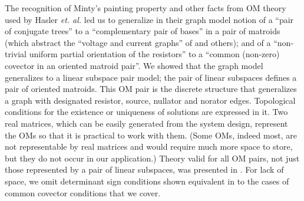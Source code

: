 \documentclass{article}
\newcommand{\extra}[1]{}
\begin{document}
\extra{Preliminary connections between our approach and the 
issue of DC operating point stability \cite{Green} were published
\cite{sdcISCAS98}, but relating these determinant based results
to common covectors is still under investigation.}

The recognition of Minty's painting property\cite{VandewalleChua} 
and other facts
from OM
theory used by Hasler \textit{et. al.} 
\cite{HaslerNeirynck,Fosseprez,HaslerDApplMath} led us to 
generalize in \cite{sdcOMP}
their graph model notion of a ``pair of 
conjugate trees''
to a ``complementary pair of bases''
in a pair of matroids (which abstract the ``voltage and current graphs''
of \cite{ChensBook} and others); and of 
a ``non-trivial uniform partial orientation of the resistors''
to a ``common (non-zero) covector in an oriented matroid pair''.   
We showed that the graph model 
generalizes to a linear subspace pair model;
the pair of linear subspaces defines a pair of oriented matroids.
This OM pair is the discrete structure that
generalizes a graph with designated resistor, source, nullator
and norator edges.
Topological conditions
for the existence or uniqueness of solutions
are expressed in it. 
Two real matrices, which can be easily generated
from the system design, represent the OMs so that 
it is practical to work with them.  (Some OMs, indeed 
most, are not representable by real matrices and would require much more
space to store, but they do not occur in our application.)
Theory valid for all OM pairs, not just those represented by
a pair of linear subspaces, was presented in \cite{sdcOMP}.  For lack of
space, we omit determinant sign conditions shown equivalent
in \cite{sdcOMP} to the cases of common covector conditions that we cover.


\extra{

In the electrical circuit theory literature, the circuit ``topology''
means the network graph (to which Kirchhoff's laws apply)
together with particular kinds of ``device elements''
such as resistors, capacitors, voltage sources (batteries), 
current sources, etc., associated with single graph edges, and possibly
``multiport'' elements associated with multiple graph edges.
Problems with multiport elements are reduced to 
those with only single edge elements, in order to apply
the theory of  \cite{HaslerDApplMath},  through the use of 
``nullator'' and ``norator'' elements.  Detailed exposition of the problems,
reductions, theory and applications is given in \cite{HaslerNeirynck}.

}
\end{document}
